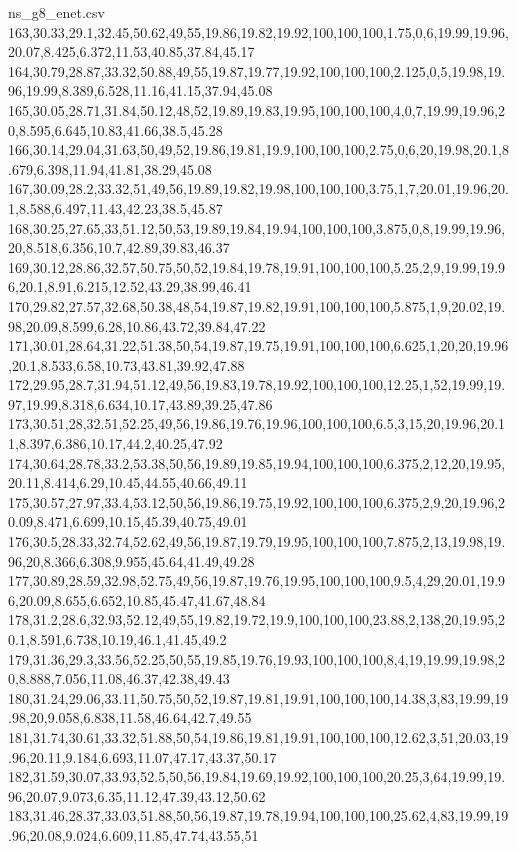 \begin{filecontents*}[overwrite]{ns_g8_enet.csv}
163,30.33,29.1,32.45,50.62,49,55,19.86,19.82,19.92,100,100,100,1.75,0,6,19.99,19.96,20.07,8.425,6.372,11.53,40.85,37.84,45.17
164,30.79,28.87,33.32,50.88,49,55,19.87,19.77,19.92,100,100,100,2.125,0,5,19.98,19.96,19.99,8.389,6.528,11.16,41.15,37.94,45.08
165,30.05,28.71,31.84,50.12,48,52,19.89,19.83,19.95,100,100,100,4,0,7,19.99,19.96,20,8.595,6.645,10.83,41.66,38.5,45.28
166,30.14,29.04,31.63,50,49,52,19.86,19.81,19.9,100,100,100,2.75,0,6,20,19.98,20.1,8.679,6.398,11.94,41.81,38.29,45.08
167,30.09,28.2,33.32,51,49,56,19.89,19.82,19.98,100,100,100,3.75,1,7,20.01,19.96,20.1,8.588,6.497,11.43,42.23,38.5,45.87
168,30.25,27.65,33,51.12,50,53,19.89,19.84,19.94,100,100,100,3.875,0,8,19.99,19.96,20,8.518,6.356,10.7,42.89,39.83,46.37
169,30.12,28.86,32.57,50.75,50,52,19.84,19.78,19.91,100,100,100,5.25,2,9,19.99,19.96,20.1,8.91,6.215,12.52,43.29,38.99,46.41
170,29.82,27.57,32.68,50.38,48,54,19.87,19.82,19.91,100,100,100,5.875,1,9,20.02,19.98,20.09,8.599,6.28,10.86,43.72,39.84,47.22
171,30.01,28.64,31.22,51.38,50,54,19.87,19.75,19.91,100,100,100,6.625,1,20,20,19.96,20.1,8.533,6.58,10.73,43.81,39.92,47.88
172,29.95,28.7,31.94,51.12,49,56,19.83,19.78,19.92,100,100,100,12.25,1,52,19.99,19.97,19.99,8.318,6.634,10.17,43.89,39.25,47.86
173,30.51,28,32.51,52.25,49,56,19.86,19.76,19.96,100,100,100,6.5,3,15,20,19.96,20.11,8.397,6.386,10.17,44.2,40.25,47.92
174,30.64,28.78,33.2,53.38,50,56,19.89,19.85,19.94,100,100,100,6.375,2,12,20,19.95,20.11,8.414,6.29,10.45,44.55,40.66,49.11
175,30.57,27.97,33.4,53.12,50,56,19.86,19.75,19.92,100,100,100,6.375,2,9,20,19.96,20.09,8.471,6.699,10.15,45.39,40.75,49.01
176,30.5,28.33,32.74,52.62,49,56,19.87,19.79,19.95,100,100,100,7.875,2,13,19.98,19.96,20,8.366,6.308,9.955,45.64,41.49,49.28
177,30.89,28.59,32.98,52.75,49,56,19.87,19.76,19.95,100,100,100,9.5,4,29,20.01,19.96,20.09,8.655,6.652,10.85,45.47,41.67,48.84
178,31.2,28.6,32.93,52.12,49,55,19.82,19.72,19.9,100,100,100,23.88,2,138,20,19.95,20.1,8.591,6.738,10.19,46.1,41.45,49.2
179,31.36,29.3,33.56,52.25,50,55,19.85,19.76,19.93,100,100,100,8,4,19,19.99,19.98,20,8.888,7.056,11.08,46.37,42.38,49.43
180,31.24,29.06,33.11,50.75,50,52,19.87,19.81,19.91,100,100,100,14.38,3,83,19.99,19.98,20,9.058,6.838,11.58,46.64,42.7,49.55
181,31.74,30.61,33.32,51.88,50,54,19.86,19.81,19.91,100,100,100,12.62,3,51,20.03,19.96,20.11,9.184,6.693,11.07,47.17,43.37,50.17
182,31.59,30.07,33.93,52.5,50,56,19.84,19.69,19.92,100,100,100,20.25,3,64,19.99,19.96,20.07,9.073,6.35,11.12,47.39,43.12,50.62
183,31.46,28.37,33.03,51.88,50,56,19.87,19.78,19.94,100,100,100,25.62,4,83,19.99,19.96,20.08,9.024,6.609,11.85,47.74,43.55,51

\end{filecontents*}
